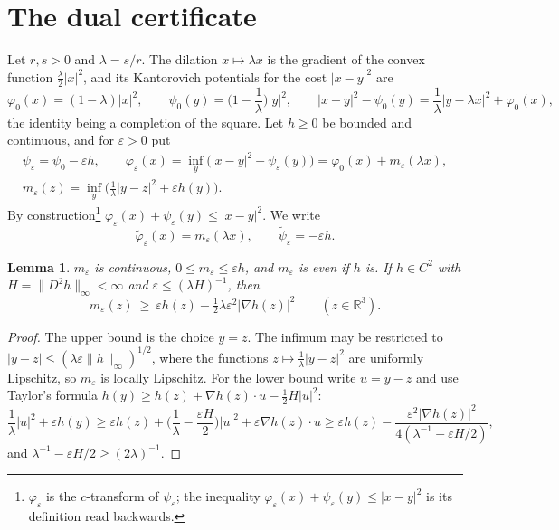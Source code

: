 \documentclass[11pt]{amsart}
\newtheorem{lemma}[theorem]{Lemma}
\theoremstyle{definition}
\newcommand{\RR}{\mathbb{R}}
\begin{document}
\section{The dual certificate}\label{sec:dual}

Let $r,s>0$ and $\lambda=s/r$. The dilation $x\mapsto\lambda x$ is the gradient of the convex function $\frac\lambda2|x|^2$, and its Kantorovich potentials for the cost $|x-y|^2$ are
\begin{equation}\label{eq:pot0}
\varphi_0(x)=(1-\lambda)|x|^2,\qquad \psi_0(y)=\Big(1-\frac1\lambda\Big)|y|^2,\qquad |x-y|^2-\psi_0(y)=\frac1\lambda|y-\lambda x|^2+\varphi_0(x),
\end{equation}
the identity being a completion of the square. Let $h\ge0$ be bounded and continuous, and for $\varepsilon>0$ put
\begin{equation}\label{eq:pair}
\begin{gathered}\psi_\varepsilon=\psi_0-\varepsilon h,\qquad \varphi_\varepsilon(x)=\inf_{y}\big(|x-y|^2-\psi_\varepsilon(y)\big)=\varphi_0(x)+m_\varepsilon(\lambda x),\\ m_\varepsilon(z)=\inf_y\Big(\frac1\lambda|y-z|^2+\varepsilon h(y)\Big).\end{gathered}
\end{equation}
By construction\footnote{$\varphi_\varepsilon$ is the $c$-transform of $\psi_\varepsilon$; the inequality $\varphi_\varepsilon(x)+\psi_\varepsilon(y)\le|x-y|^2$ is its definition read backwards.} $\varphi_\varepsilon(x)+\psi_\varepsilon(y)\le|x-y|^2$. We write
\begin{equation}\label{eq:tilde}
\tilde\varphi_\varepsilon(x)=m_\varepsilon(\lambda x),\qquad\tilde\psi_\varepsilon=-\varepsilon h .
\end{equation}

\begin{lemma}\label{lem:m}
$m_\varepsilon$ is continuous, $0\le m_\varepsilon\le\varepsilon h$, and $m_\varepsilon$ is even if $h$ is. If $h\in C^2$ with $H=\|D^2h\|_\infty<\infty$ and $\varepsilon\le(\lambda H)^{-1}$, then
\[
m_\varepsilon(z)\ \ge\ \varepsilon h(z)-\tfrac12\lambda\varepsilon^2|\nabla h(z)|^2\qquad(z\in\RR^3).
\]
\end{lemma}

\begin{proof}
The upper bound is the choice $y=z$. The infimum may be restricted to $|y-z|\le(\lambda\varepsilon\|h\|_\infty)^{1/2}$, where the functions $z\mapsto\frac1\lambda|y-z|^2$ are uniformly Lipschitz, so $m_\varepsilon$ is locally Lipschitz. For the lower bound write $u=y-z$ and use Taylor's formula $h(y)\ge h(z)+\nabla h(z)\cdot u-\frac12H|u|^2$:
\[
\frac1\lambda|u|^2+\varepsilon h(y)\ge\varepsilon h(z)+\Big(\frac1\lambda-\frac{\varepsilon H}2\Big)|u|^2+\varepsilon\nabla h(z)\cdot u\ge\varepsilon h(z)-\frac{\varepsilon^2|\nabla h(z)|^2}{4(\lambda^{-1}-\varepsilon H/2)},
\]
and $\lambda^{-1}-\varepsilon H/2\ge(2\lambda)^{-1}$.
\end{proof}
\end{document}
